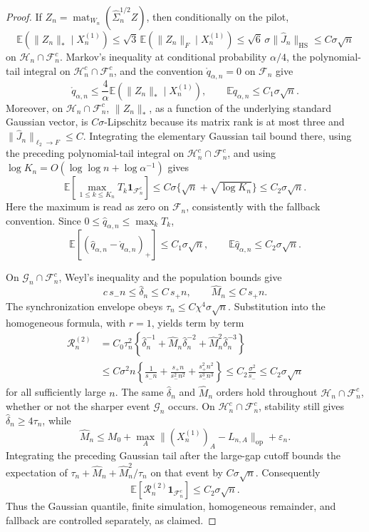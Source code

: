 \documentclass{article}
\begin{document}
\begin{proof}
If \(Z_n=\operatorname{mat}_{W_n}(\widehat\Sigma_n^{1/2}Z)\), then conditionally on the pilot,
\[
\mathbb E(\lVert Z_n\rVert_*\mid X_n^{(1)})
\le\sqrt3\,\mathbb E(\lVert Z_n\rVert_F\mid X_n^{(1)})
\le\sqrt6\,\sigma\lVert\widehat J_n\rVert_{\mathrm{HS}}
\le C\sigma\sqrt n
\]
on \(\mathcal H_n\cap\mathcal F_n^c\).  Markov's inequality at conditional probability \(\alpha/4\), the polynomial-tail integral on
\(\mathcal H_n^c\cap\mathcal F_n^c\), and the convention
\(\mathring q_{\alpha,n}=0\) on \(\mathcal F_n\) give
\[
\mathring q_{\alpha,n}
\le\frac4\alpha\mathbb E(\lVert Z_n\rVert_*\mid X_n^{(1)}),
\qquad
\mathbb E\mathring q_{\alpha,n}\le C_1\sigma\sqrt n.
\]
Moreover, on \(\mathcal H_n\cap\mathcal F_n^c\), \(\lVert Z_n\rVert_*\), as a function of the underlying standard Gaussian vector, is \(C\sigma\)-Lipschitz because its matrix rank is at most three and
\(\lVert\widehat J_n\rVert_{\ell_2\to F}\le C\).  Integrating the elementary Gaussian tail bound there, using the preceding polynomial-tail integral on
\(\mathcal H_n^c\cap\mathcal F_n^c\), and using
\(\log K_n=O(\log\log n+\log\alpha^{-1})\) gives
\[
\mathbb E\!\left[
\max_{1\le k\le K_n}T_k\mathbf1_{\mathcal F_n^c}\right]
\le C\sigma\{\sqrt n+\sqrt{\log K_n}\}
\le C_2\sigma\sqrt n.
\]
Here the maximum is read as zero on \(\mathcal F_n\), consistently with the fallback convention.  Since
\(0\le\widehat q_{\alpha,n}\le\max_kT_k\),
\[
\mathbb E[(\widehat q_{\alpha,n}-\mathring q_{\alpha,n})_+]
\le C_1\sigma\sqrt n,
\qquad
\mathbb E\widehat q_{\alpha,n}\le C_2\sigma\sqrt n.
\]

On \(\mathcal G_n\cap\mathcal F_n^c\), Weyl's inequality and the population bounds give
\[
c\,s_-n\le\widehat\delta_n\le C\,s_+n,
\qquad
\widehat M_n\le C\,s_+n.
\]
The synchronization envelope obeys
\(\tau_n\le C\chi^4\sigma\sqrt n\).  Substitution into the homogeneous formula, with \(r=1\), yields term by term
\[
\begin{aligned}
\mathscr R_n^{(2)}
&=C_0\tau_n^2
\left\{\widehat\delta_n^{-1}
+\widehat M_n\widehat\delta_n^{-2}
+\widehat M_n^2\widehat\delta_n^{-3}\right\}\\
&\le
C\sigma^2n\left\{\frac1{s_-n}
+\frac{s_+n}{s_-^2n^2}
+\frac{s_+^2n^2}{s_-^3n^3}\right\}
\le C_2\frac{\sigma^2}{s_-}
\le C_2\sigma\sqrt n
\end{aligned}
\]
for all sufficiently large \(n\).  The same \(\widehat\delta_n\) and
\(\widehat M_n\) orders hold throughout
\(\mathcal H_n\cap\mathcal F_n^c\), whether or not the sharper event
\(\mathcal G_n\) occurs.  On
\(\mathcal H_n^c\cap\mathcal F_n^c\), stability still gives
\(\widehat\delta_n\ge4\tau_n\), while
\[
\widehat M_n\le M_0+
\max_A\lVert(X_n^{(1)})_A-L_{n,A}\rVert_{\mathrm{op}}+\varepsilon_n.
\]
Integrating the preceding Gaussian tail after the large-gap cutoff bounds the expectation of
\(\tau_n+\widehat M_n+\widehat M_n^2/\tau_n\) on that event by
\(C\sigma\sqrt n\).  Consequently
\[
\mathbb E[\mathscr R_n^{(2)}\mathbf1_{\mathcal F_n^c}]
\le C_2\sigma\sqrt n.
\]
Thus the Gaussian quantile, finite simulation, homogeneous remainder, and fallback are controlled separately, as claimed.
\end{proof}
\end{document}
